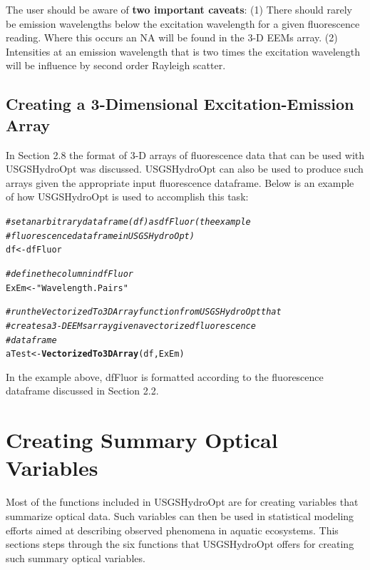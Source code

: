 \documentclass[a4paper,11pt]{article}\usepackage[]{graphicx}\usepackage[]{color}
\makeatletter
\newcommand{\hlstr}[1]{\textcolor[rgb]{0.192,0.494,0.8}{#1}}%
\newcommand{\hlcom}[1]{\textcolor[rgb]{0.678,0.584,0.686}{\textit{#1}}}%
\newcommand{\hlstd}[1]{\textcolor[rgb]{0.345,0.345,0.345}{#1}}%
\newcommand{\hlkwb}[1]{\textcolor[rgb]{0.69,0.353,0.396}{#1}}%
\newcommand{\hlkwd}[1]{\textcolor[rgb]{0.737,0.353,0.396}{\textbf{#1}}}%
\newenvironment{kframe}{%
 \def\at@end@of@kframe{}%
 \ifinner\ifhmode%
  \def\at@end@of@kframe{\end{minipage}}%
  \begin{minipage}{\columnwidth}%
 \fi\fi%
 \def\FrameCommand##1{\hskip\@totalleftmargin \hskip-\fboxsep
 \colorbox{shadecolor}{##1}\hskip-\fboxsep
     \hskip-\linewidth \hskip-\@totalleftmargin \hskip\columnwidth}%
 \MakeFramed {\advance\hsize-\width
   \@totalleftmargin\z@ \linewidth\hsize
   \@setminipage}}%
 {\par\unskip\endMakeFramed%
 \at@end@of@kframe}
\newenvironment{knitrout}{}{} %
\makeatother
\begin{document}
The user should be aware of \textbf{two important caveats}: (1) There should rarely be emission wavelengths below the excitation wavelength for a given fluorescence reading. Where this occurs an NA will be found in the 3-D EEMs array. (2) Intensities at an emission wavelength that is two times the excitation wavelength will be influence by second order Rayleigh scatter. 

\subsection{Creating a 3-Dimensional Excitation-Emission Array}
In Section 2.8 the format of 3-D arrays of fluorescence data that can be used with USGSHydroOpt was discussed. USGSHydroOpt can also be used to produce such arrays given the appropriate input fluorescence dataframe. Below is an example of how USGSHydroOpt is used to accomplish this task: 

\begin{knitrout}
\color{fgcolor}\begin{kframe}
\begin{alltt}
\hlcom{# set an arbitrary data frame (df) as dfFluor (the example}
\hlcom{# fluorescence dataframe in USGSHydroOpt)}
\hlstd{df} \hlkwb{<-} \hlstd{dfFluor}

\hlcom{# define the column in dfFluor}
\hlstd{ExEm} \hlkwb{<-} \hlstr{"Wavelength.Pairs"}

\hlcom{# run the VectorizedTo3DArray function from USGSHydroOpt that}
\hlcom{# creates a 3-D EEMs array given a vectorized fluorescence}
\hlcom{# dataframe}
\hlstd{aTest} \hlkwb{<-} \hlkwd{VectorizedTo3DArray}\hlstd{(df, ExEm)}
\end{alltt}
\end{kframe}
\end{knitrout}

In the example above, dfFluor is formatted according to the fluorescence dataframe discussed in Section 2.2. 

\section{Creating Summary Optical Variables}
Most of the functions included in USGSHydroOpt are for creating variables that summarize optical data. Such variables can then be used in statistical modeling efforts aimed at describing observed phenomena in aquatic ecosystems. This sections steps through the six functions that USGSHydroOpt offers for creating such summary optical variables.
\end{document}

